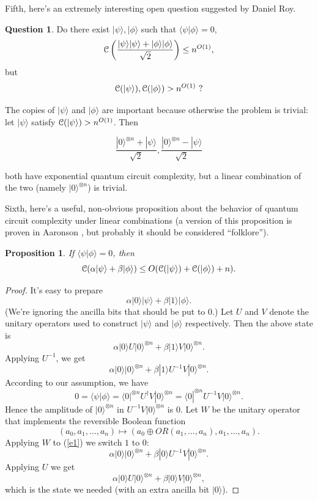 \documentclass[11pt]{report}
\theoremstyle{plain}
\newtheorem{proposition}[theorem]{Proposition}
\theoremstyle{definition}
\newtheorem{question}[theorem]{Question}
\renewcommand{\bra}[1]{\langle#1|}
\renewcommand{\ket}[1]{|#1\rangle}
\newcommand{\braket}[2]{\langle#1|#2\rangle}
\begin{document}
Fifth, here's an extremely interesting open question suggested by Daniel Roy.

\begin{question}
Do there exist $\ket{\psi},\ket{\phi}$ such that
$\braket{\psi}{\phi}=0$,
\[
{\cal
  C}\left(\frac{\ket{\psi}\ket{\psi}+\ket{\phi}\ket{\phi}}{\sqrt{2}}
\right)\leq n^{O(1)},
\]
but
\[
{\cal C}(\ket{\psi}),{\cal C}(\ket{\phi})> n^{O(1)}\ ?
\]
\end{question}

The copies of  $\ket{\psi}$ and $\ket{\phi}$ are important because otherwise the problem is trivial: let $\ket{\psi}$ satisfy ${\cal C}(\ket{\psi}) > n^{O(1)}$.
Then

$$\frac{\ket{0}^{\otimes n}+\ket{\psi}}{\sqrt{2}}, \frac{\ket{0}^{\otimes n}-\ket{\psi}}{\sqrt{2}}$$

\noindent both have exponential quantum circuit complexity, but a linear combination of the two (namely $\ket{0}^{\otimes n}$) is trivial.

Sixth, here's a useful, non-obvious proposition about the behavior of quantum circuit complexity under linear combinations (a version of this proposition is proven in Aaronson \cite{aar:mlin}, but probably it should be considered ``folklore'').

\begin{proposition}
\label{lincomb}
If $\braket{\psi}{\phi}=0$, then
\[
{\cal C}(\alpha\ket{\psi}+\beta\ket{\phi})\leq
O({\cal C}(\ket{\psi})+{\cal C}(\ket{\phi})+n).
\]
\end{proposition}
\begin{proof}
It's easy to prepare
\[
\alpha\ket{0}\ket{\psi}+\beta\ket{1}\ket{\phi}.
\]
(We're ignoring the ancilla bits that should be put to $0$.)
Let $U$ and $V$ denote the unitary operators used to
construct $\ket{\psi}$ and $\ket{\phi}$ respectively. Then the above
state is
\[
\alpha\ket{0} U \ket{0}^{\otimes n}+\beta \ket{1} V \ket{0}^{\otimes n}.
\]
Applying $U^{-1}$, we get
\begin{equation}\label{e1}
\alpha \ket{0} \ket{0}^{\otimes n}+\beta \ket{1} U^{-1}V \ket{0}^{\otimes n}.
\end{equation}
According to our assumption, we have
\[
0=\braket{\psi}{\phi}=\bra{0}^{\otimes
  n} U^\dagger V\ket{0}^{\otimes n} = \bra{0}^{\otimes n} U^{-1}V \ket{0}^{\otimes n}.
\]
Hence the amplitude of $\ket{0}^{\otimes n}$ in
$U^{-1}V\ket{0}^{\otimes n}$ is $0$. Let $W$ be the unitary
operator that implements the reversible Boolean function
\[
(a_0,a_1,\dots,a_n)\mapsto (a_0\oplus OR(a_1,\dots,a_n),a_1,\dots,a_n).
\]
Applying $W$ to (\ref{e1}) we switch $1$ to $0$:
\[
\alpha \ket{0} \ket{0}^{\otimes n}+\beta \ket{0} U^{-1}V \ket{0}^{\otimes n}.
\]
Applying $U$ we get
\[
\alpha \ket{0} U \ket{0}^{\otimes n}+\beta \ket{0} V \ket{0}^{\otimes n},
\]
which is the state we needed (with an extra ancilla bit $\ket{0}$).
\end{proof}
\end{document}
